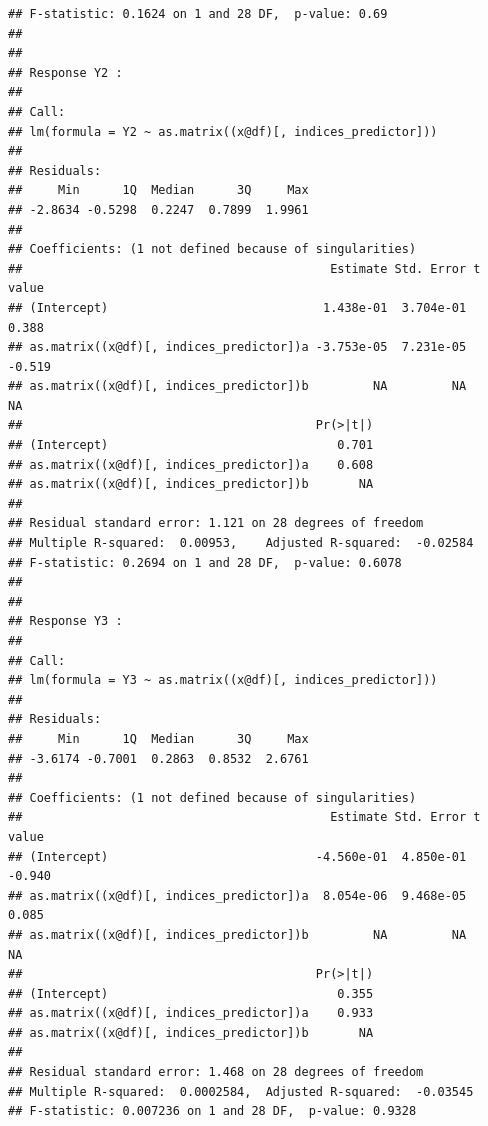 \documentclass{article}\usepackage[]{graphicx}\usepackage[]{color}
\makeatletter
\newenvironment{kframe}{%
 \def\at@end@of@kframe{}%
 \ifinner\ifhmode%
  \def\at@end@of@kframe{\end{minipage}}%
  \begin{minipage}{\columnwidth}%
 \fi\fi%
 \def\FrameCommand##1{\hskip\@totalleftmargin \hskip-\fboxsep
 \colorbox{shadecolor}{##1}\hskip-\fboxsep
     \hskip-\linewidth \hskip-\@totalleftmargin \hskip\columnwidth}%
 \MakeFramed {\advance\hsize-\width
   \@totalleftmargin\z@ \linewidth\hsize
   \@setminipage}}%
 {\par\unskip\endMakeFramed%
 \at@end@of@kframe}
\newenvironment{knitrout}{}{} %
\makeatother
\begin{document}
\begin{knitrout}
\begin{kframe}
\begin{verbatim}
## F-statistic: 0.1624 on 1 and 28 DF,  p-value: 0.69
## 
## 
## Response Y2 :
## 
## Call:
## lm(formula = Y2 ~ as.matrix((x@df)[, indices_predictor]))
## 
## Residuals:
##     Min      1Q  Median      3Q     Max 
## -2.8634 -0.5298  0.2247  0.7899  1.9961 
## 
## Coefficients: (1 not defined because of singularities)
##                                           Estimate Std. Error t value
## (Intercept)                              1.438e-01  3.704e-01   0.388
## as.matrix((x@df)[, indices_predictor])a -3.753e-05  7.231e-05  -0.519
## as.matrix((x@df)[, indices_predictor])b         NA         NA      NA
##                                         Pr(>|t|)
## (Intercept)                                0.701
## as.matrix((x@df)[, indices_predictor])a    0.608
## as.matrix((x@df)[, indices_predictor])b       NA
## 
## Residual standard error: 1.121 on 28 degrees of freedom
## Multiple R-squared:  0.00953,	Adjusted R-squared:  -0.02584 
## F-statistic: 0.2694 on 1 and 28 DF,  p-value: 0.6078
## 
## 
## Response Y3 :
## 
## Call:
## lm(formula = Y3 ~ as.matrix((x@df)[, indices_predictor]))
## 
## Residuals:
##     Min      1Q  Median      3Q     Max 
## -3.6174 -0.7001  0.2863  0.8532  2.6761 
## 
## Coefficients: (1 not defined because of singularities)
##                                           Estimate Std. Error t value
## (Intercept)                             -4.560e-01  4.850e-01  -0.940
## as.matrix((x@df)[, indices_predictor])a  8.054e-06  9.468e-05   0.085
## as.matrix((x@df)[, indices_predictor])b         NA         NA      NA
##                                         Pr(>|t|)
## (Intercept)                                0.355
## as.matrix((x@df)[, indices_predictor])a    0.933
## as.matrix((x@df)[, indices_predictor])b       NA
## 
## Residual standard error: 1.468 on 28 degrees of freedom
## Multiple R-squared:  0.0002584,	Adjusted R-squared:  -0.03545 
## F-statistic: 0.007236 on 1 and 28 DF,  p-value: 0.9328
\end{verbatim}
\end{kframe}
\end{knitrout}
\end{document}
